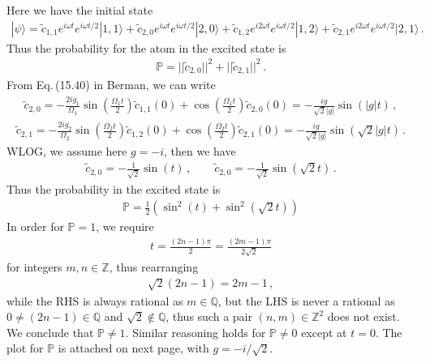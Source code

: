 \documentclass[11pt, oneside]{book}
\theoremstyle{break}
\theoremstyle{break}
\newcommand{\Z}{\mathbb{Z}}
\newcommand{\Q}{\mathbb{Q}}
\newcommand{\that}[1]{\widetilde{#1}}
\begin{document}
\chapter{}
Here we have the initial state
\begin{align*}
|\psi\rangle = \that{c}_{1,1}e^{i \omega t} e^{i\omega t/2} |1,1\rangle + \that{c}_{2,0}e^{i \omega t} e^{i\omega t/2} |2,0\rangle + 
\that{c}_{1,2}e^{i 2\omega t} e^{i\omega t/2} |1,2\rangle + \that{c}_{2,1}e^{i 2\omega t} e^{i\omega t/2} |2,1\rangle\,.
\end{align*}
Thus the probability for the atom in the excited state is 
\begin{align*}
\mathbb{P} = ||\that{c}_{2,0}||^2 + ||\that{c}_{2,1}||^2\,.
\end{align*}
From Eq.\,(15.40) in Berman, we can write
\begin{align*}
\that{c}_{2,0} = -\frac{2ig_1}{\Omega_1} \sin\left(\frac{\Omega_1t}{2}\right) \that{c}_{1,1}(0) + 
\cos\left( \frac{\Omega_1 t}{2}\right) \that{c}_{2,0}(0) = -\frac{ig}{\sqrt{2}|g|} \sin\left(|g| t\right)\,,
\end{align*}
\begin{align*}
\that{c}_{2,1} = -\frac{2ig_2}{\Omega_2} \sin\left(\frac{\Omega_2t}{2}\right) \that{c}_{1,2}(0) + 
\cos\left( \frac{\Omega_2 t}{2}\right) \that{c}_{2,1}(0) =
-\frac{ig}{\sqrt{2}|g|} \sin\left(\sqrt{2}|g|t\right)\,.
\end{align*}
WLOG, we assume here $g = -i$, then we have
\begin{align*}
\that{c}_{2,0} = -\frac{1}{\sqrt{2}} \sin(t)\,,\qquad
\that{c}_{2,0} = -\frac{1}{\sqrt{2}} \sin(\sqrt{2}t)\,.
\end{align*}
Thus the probability in the excited state is
\begin{align*}
\mathbb{P} = \frac{1}{2}\left(\sin^2(t) + \sin^2(\sqrt{2}t)\right)
\end{align*}
In order for $\mathbb{P} = 1$, we require 
\begin{align*}
t = \frac{(2n-1) \pi}{2} = \frac{(2m-1) \pi}{2\sqrt{2}} 
\end{align*}
for integers $m,n \in \Z$, thus rearranging
\begin{align*}
\sqrt{2}(2 n- 1) = 2m-1\,,
\end{align*}
while the RHS is always rational as $m \in \Q$, but the LHS is never a rational as $0\neq (2n-1) \in \Q$ and $\sqrt{2}\notin \Q$, thus such a pair $(n,m) \in \Z^2$ does not exist. We conclude that $\mathbb{P}\neq 1$. Similar reasoning holds for $\mathbb{P}\neq 0$ except at $t = 0$. The plot for $\mathbb{P}$ is attached on next page, with $g = -i/\sqrt{2}$.  
\end{document}
